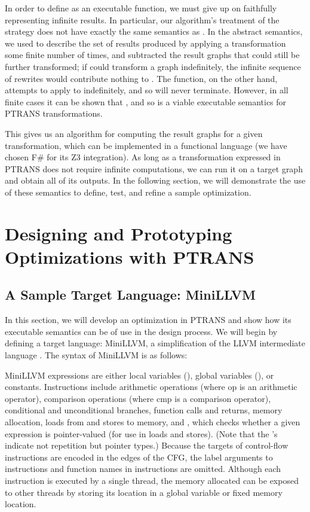 \documentclass{eptcs}
\newcommand{\ptrans}[0]{PTRANS}
\begin{document}
In order to define  as an executable function, we must give up on faithfully representing infinite results. In particular, our algorithm's treatment of the  strategy does not have exactly the same semantics as . In the abstract semantics, we used  to describe the set of results produced by applying a transformation  some finite number of times, and subtracted the result graphs that could still be further transformed; if  could transform a graph  indefinitely, the infinite sequence of rewrites would contribute nothing to . The  function, on the other hand, attempts to apply  to  indefinitely, and so will never terminate. However, in all finite cases it can be shown that , and so  is a viable executable semantics for {\ptrans} transformations.

This gives us an algorithm for computing the result graphs for a given transformation, which can be implemented in a functional language (we have chosen F\# for its Z3 integration). As long as a transformation expressed in {\ptrans} does not require infinite computations, we can run it on a target graph and obtain all of its outputs. In the following section, we will demonstrate the use of these semantics to define, test, and refine a sample optimization.

\section{Designing and Prototyping Optimizations with {\ptrans}}
\subsection{A Sample Target Language: MiniLLVM}
\label{language}
In this section, we will develop an optimization in {\ptrans} and show how its executable semantics can be of use in the design process. We will begin by defining a target language: MiniLLVM, a simplification of the LLVM intermediate language \cite{llvm}. The syntax of MiniLLVM is as follows:

\vspace{-.2in}

MiniLLVM expressions are either local variables (), global variables (), or constants. Instructions include arithmetic operations (where op is an arithmetic operator), comparison operations (where cmp is a comparison operator), conditional and unconditional branches, function calls and returns, memory allocation, loads from and stores to memory, and , which checks whether a given expression is pointer-valued (for use in loads and stores). (Note that the 's indicate not repetition but pointer types.) Because the targets of control-flow instructions are encoded in the edges of the \ac{CFG}, the label arguments to  instructions and function names in  instructions are omitted. Although each  instruction is executed by a single thread, the memory allocated can be exposed to other threads by storing its location in a global variable or fixed memory location. 
\end{document}
